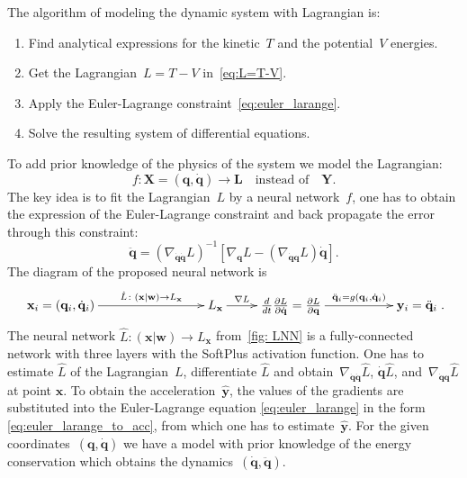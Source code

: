 \documentclass[12pt]{paper}
\begin{document}
The algorithm of modeling the dynamic system with  Lagrangian is:
\begin{enumerate}
	\item Find analytical expressions for the kinetic~$T$ and the potential~$V$ energies.
	\item Get the Lagrangian~$L=T-V$ in~\eqref{eq:L=T-V}.
	\item Apply the Euler-Lagrange constraint~\eqref{eq:euler_larange}.
	\item Solve the resulting system of differential equations.
\end{enumerate}
To add prior knowledge of the physics of the system we model the Lagrangian:
\begin{equation}
f: \mathbf{X} = (\mathbf{q}, \dot{\mathbf{q}}) \rightarrow \mathbf{L} \quad \text{instead of} \quad \mathbf{Y}.
\end{equation}
The key idea is to fit the Lagrangian~$L$ by a neural network~$f$, one has to obtain the expression of the Euler-Lagrange constraint and back propagate the error through this constraint:
\begin{equation}
\ddot{\mathbf{q}} =\left(\nabla_{\dot{\mathbf{q}} \dot{\mathbf{q}}} L\right)^{-1}\left[\nabla_{\mathbf{q}} L-\left(\nabla_{\dot{\mathbf{q}}\mathbf{q}} L\right) \dot{\mathbf{q}}\right].
\label{eq:euler_larange_to_acc}
\end{equation}
The diagram of the proposed neural network is
\begin{equation}
    \xymatrix{
    \mathbf{x}_i = (\mathbf{q}_i, \dot{\mathbf{q}}_i) \ar@{->}[rrr]^-{\hat{L} \colon (\mathbf{x} | \mathbf{w}) \to L_\mathbf{x}} & & & L_\mathbf{x} \ar@{->}[r]^-{\nabla L} & \frac{d}{d t} \frac{\partial L}{\partial \dot{\mathbf{q}}} =\frac{\partial L}{\partial \mathbf{q}} \ar@{->}[rr]^-{{\ddot{\mathbf{q}}_i = g\left(\mathbf{q}_i, \dot{\mathbf{q}}_i\right)}} &  & \mathbf{y}_i = \ddot{\mathbf{q}}_i
    }.
\label{fig: LNN}
\end{equation}
The neural network $\hat{L} \colon (\mathbf{x} | \mathbf{w}) \to L_\mathbf{x}$ from~\eqref{fig: LNN} is a fully-connected network with three layers with the SoftPlus activation function.  One has to estimate $\hat{L}$ of the Lagrangian~$L$, differentiate $\hat{L}$ and obtain~$\nabla_{\dot{\mathbf{q}}\dot{\mathbf{q}}}\hat{L}$, $\dot{\mathbf{q}}\hat{L}$, and~$\nabla_{\dot{\mathbf{q}}\mathbf{q}} \hat{L}$ at point $\mathbf{x}$. To obtain the acceleration~$\hat{\mathbf{y}}$, the values of the gradients are substituted into the Euler-Lagrange equation \eqref{eq:euler_larange} in the form \eqref{eq:euler_larange_to_acc}, from which one has to estimate~$\hat{\mathbf{y}}$. For the given coordinates~$(\mathbf{q}, \dot{\mathbf{q}})$ we have a model with prior knowledge of the energy conservation which obtains the dynamics~$(\dot{\mathbf{q}}, \ddot{\mathbf{q}})$. 
\end{document}
